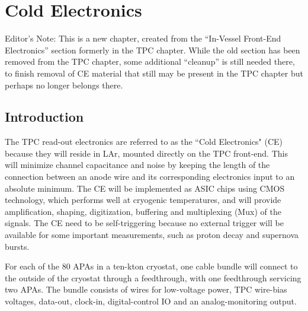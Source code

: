 \chapter{Cold Electronics}
\label{ch:ce}

\begin{editornote}
  Editor's Note:  This is a new chapter, created from the ``In-Vessel Front-End Electronics'' section formerly in the TPC chapter.
While the old section has been removed from the TPC chapter, some additional ``cleanup'' is still needed there,
to finish removal of CE material that still may be present in the TPC chapter but perhaps no longer belongs there.
\end{editornote}
%
\section{Introduction}
\label{sec:ce-intro}

The TPC read-out electronics are referred to as the ``Cold Electronics" (CE) because they will reside in LAr,
mounted directly on the TPC front-end.
This will minimize channel capacitance and noise by keeping the length of the connection between an anode wire
and its corresponding electronics input to an absolute minimum.
The CE will be implemented as ASIC chips using CMOS technology, which performs well at cryogenic temperatures,
and will provide amplification, shaping, digitization, buffering and multiplexing (Mux) of the signals.
The CE need to be self-triggering because no external trigger will be available for some important measurements,
such as proton decay and supernova bursts.

For each of the 80 APAs in a ten-kton cryostat, one cable bundle will connect to the outside of the cryostat through
a feedthrough, with one feedthrough servicing two APAs.
The bundle consists of wires for low-voltage power, TPC wire-bias voltages, data-out, clock-in,
digital-control IO and an analog-monitoring output.

